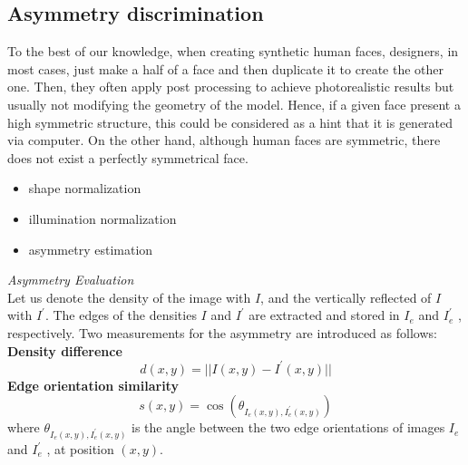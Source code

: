 \documentclass[10pt,a4paper]{book}
\begin{document}
\subsection{Asymmetry discrimination}
To the best of our knowledge, when creating synthetic human faces, designers, in most cases, just make a half of a face and then duplicate it to create the other one. Then, they often apply post processing to achieve photorealistic results but
usually not modifying the geometry of the model. Hence, if a given face present a high symmetric structure, this could be considered as a hint that it is generated via computer. On the other hand, although human faces are symmetric, there does not exist a perfectly symmetrical face.
\begin{itemize}
\item shape normalization
\item illumination normalization
\item asymmetry estimation
\end{itemize}
\emph{Asymmetry Evaluation}\\
Let us denote the density of the image with $I$, and the vertically reflected of $I$ with $I^{'}$. The edges of the densities $I$ and $I^{'}$ are extracted and stored in $I_e$ and $I_e^{'}$ , respectively. Two measurements for the asymmetry are introduced as follows:
\textbf{Density difference}
$$ d(x,y) = || I(x,y) - I^{'}(x,y)||$$
\textbf{Edge orientation similarity}
$$ s(x,y) = \cos (\theta_{I_e(x,y),I_e^{'}(x,y)})$$
where $\theta_{I_e(x,y),I_e^{'}(x,y)}$ is the angle between the two edge
orientations of images $I_e$ and $I_e^{'}$ , at position $(x,y)$.
\end{document}
